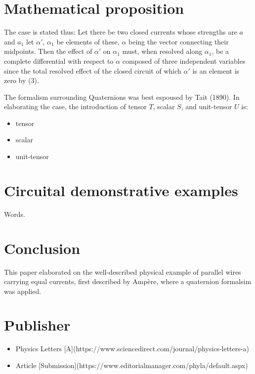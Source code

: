 \documentclass[]{article}
\begin{document}
\section{Mathematical proposition}
The case is stated thus: Let there be two closed currents whose strengths are $a$ and $a_1$ let $\alpha\prime$, $\alpha_1$ be elements of these, $\alpha$ being the vector connecting their midpoints. Then the effect of $\alpha\prime$ on $\alpha_1$ must, when resolved along $\alpha_1$, be a complete differential with respect to $\alpha$ composed of three independent variables since the total resolved effect of the closed circuit of which $\alpha\prime$ is an element is zero by (3).

The formalism surrounding Quaternions was best espoused by Tait (1890). In elaborating the case, the introduction of tensor $T$, scalar $S$, and unit-tensor $U$ is:

\begin{itemize}
  \item tensor
  \item scalar
  \item unit-tensor
\end{itemize}

\section{Circuital demonstrative examples}
Words.

\section{Conclusion}
This paper elaborated on the well-described physical example of parallel wires carrying equal currents, first described by Amp\`ere, where a quaternion formalsim was applied. 

\section{Publisher}
\begin{itemize}
  \item  Physics Letters [A](https://www.sciencedirect.com/journal/physics-letters-a)
  \item Article [Submission](https://www.editorialmanager.com/phyla/default.aspx)
\end{itemize}
\end{document}
